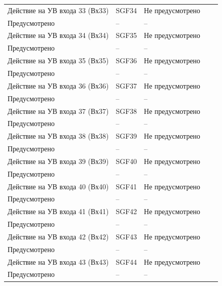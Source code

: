 \begin{longtable}{|>{\centering\arraybackslash}m{5.3cm}|>{\centering\arraybackslash}m{3.3cm}|>{\centering\arraybackslash}m{4.2cm}|>{\centering\arraybackslash}m{1.8cm}|>{\centering\arraybackslash}m{1cm}|}
\hline
\centering Действие на УВ входа 33 (Вх33)  & \centering SGF34 & \centering Не предусмотрено \\ Предусмотрено & \centering -- & \centering \arraybackslash -- \\
\hline
\centering Действие на УВ входа 34 (Вх34)  & \centering SGF35 & \centering Не предусмотрено \\ Предусмотрено & \centering -- & \centering \arraybackslash -- \\
\hline
\centering Действие на УВ входа 35 (Вх35)  & \centering SGF36 & \centering Не предусмотрено \\ Предусмотрено & \centering -- & \centering \arraybackslash -- \\
\hline
\centering Действие на УВ входа 36 (Вх36)  & \centering SGF37 & \centering Не предусмотрено \\ Предусмотрено & \centering -- & \centering \arraybackslash -- \\
\hline
\centering Действие на УВ входа 37 (Вх37)  & \centering SGF38 & \centering Не предусмотрено \\ Предусмотрено & \centering -- & \centering \arraybackslash -- \\
\hline
\centering Действие на УВ входа 38 (Вх38)  & \centering SGF39 & \centering Не предусмотрено \\ Предусмотрено & \centering -- & \centering \arraybackslash -- \\
\hline
\centering Действие на УВ входа 39 (Вх39)  & \centering SGF40 & \centering Не предусмотрено \\ Предусмотрено & \centering -- & \centering \arraybackslash -- \\
\hline
\centering Действие на УВ входа 40 (Вх40)  & \centering SGF41 & \centering Не предусмотрено \\ Предусмотрено & \centering -- & \centering \arraybackslash -- \\
\hline
\centering Действие на УВ входа 41 (Вх41)  & \centering SGF42 & \centering Не предусмотрено \\ Предусмотрено & \centering -- & \centering \arraybackslash -- \\
\hline
\centering Действие на УВ входа 42 (Вх42)  & \centering SGF43 & \centering Не предусмотрено \\ Предусмотрено & \centering -- & \centering \arraybackslash -- \\
\hline
\centering Действие на УВ входа 43 (Вх43)  & \centering SGF44 & \centering Не предусмотрено \\ Предусмотрено & \centering -- & \centering \arraybackslash -- \\

\end{longtable}

